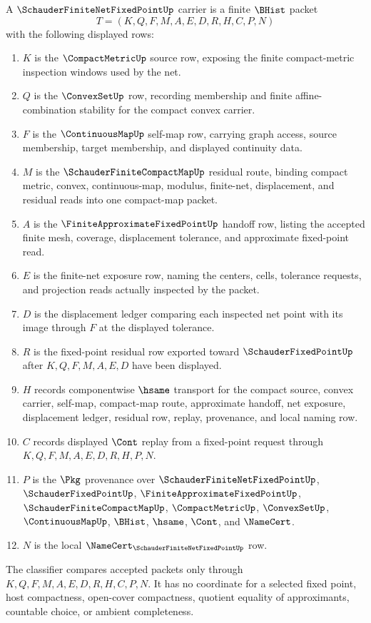 \begin{definition}
\label{def:schauder-finite-net-fixed-point-carrier}
A $\SchauderFiniteNetFixedPointUp$ carrier is a finite $\BHist$ packet
$$
T=(K,Q,F,M,A,E,D,R,H,C,P,N)
$$
with the following displayed rows:
\begin{enumerate}
\item $K$ is the $\CompactMetricUp$ source row, exposing the finite compact-metric inspection windows used by the net.
\item $Q$ is the $\ConvexSetUp$ row, recording membership and finite affine-combination stability for the compact convex carrier.
\item $F$ is the $\ContinuousMapUp$ self-map row, carrying graph access, source membership, target membership, and displayed continuity data.
\item $M$ is the $\SchauderFiniteCompactMapUp$ residual route, binding compact metric, convex, continuous-map, modulus, finite-net, displacement, and residual reads into one compact-map packet.
\item $A$ is the $\FiniteApproximateFixedPointUp$ handoff row, listing the accepted finite mesh, coverage, displacement tolerance, and approximate fixed-point read.
\item $E$ is the finite-net exposure row, naming the centers, cells, tolerance requests, and projection reads actually inspected by the packet.
\item $D$ is the displacement ledger comparing each inspected net point with its image through $F$ at the displayed tolerance.
\item $R$ is the fixed-point residual row exported toward $\SchauderFixedPointUp$ after $K,Q,F,M,A,E,D$ have been displayed.
\item $H$ records componentwise $\hsame$ transport for the compact source, convex carrier, self-map, compact-map route, approximate handoff, net exposure, displacement ledger, residual row, replay, provenance, and local naming row.
\item $C$ records displayed $\Cont$ replay from a fixed-point request through $K,Q,F,M,A,E,D,R,H,P,N$.
\item $P$ is the $\Pkg$ provenance over $\SchauderFiniteNetFixedPointUp$, $\SchauderFixedPointUp$, $\FiniteApproximateFixedPointUp$, $\SchauderFiniteCompactMapUp$, $\CompactMetricUp$, $\ConvexSetUp$, $\ContinuousMapUp$, $\BHist$, $\hsame$, $\Cont$, and $\NameCert$.
\item $N$ is the local $\NameCert_{\SchauderFiniteNetFixedPointUp}$ row.
\end{enumerate}
The classifier compares accepted packets only through $K,Q,F,M,A,E,D,R,H,C,P,N$. It has no coordinate for a selected fixed point, host compactness, open-cover compactness, quotient equality of approximants, countable choice, or ambient completeness.
\end{definition}

